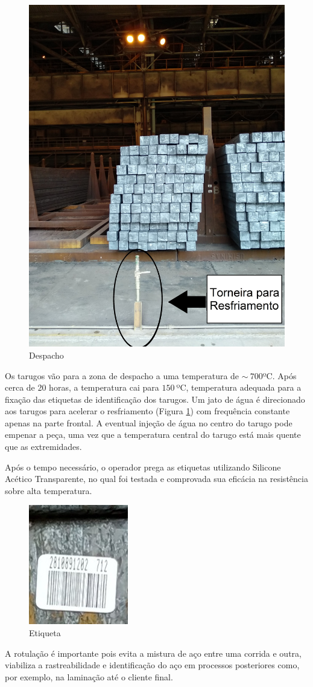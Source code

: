 \begin{figure}[htbp]
	\centering
	\includegraphics[width=0.5\linewidth]{figuras/Steel/despacho.jpg}
	\caption{Despacho}
	\label{fig:despacho}
\end{figure}

Os tarugos vão para a zona de despacho a uma temperatura de $\sim~700$ºC.
%
Após cerca de 20 horas, a temperatura cai para $150~$ºC, temperatura adequada para a fixação das etiquetas de identificação dos tarugos.
%
Um jato de água é direcionado aos tarugos para acelerar o resfriamento (Figura \ref{fig:despacho}) com frequência constante apenas na parte frontal.
%
A eventual injeção de água no centro do tarugo pode empenar a peça, uma vez que a temperatura central do tarugo está mais quente que as extremidades.


Após o tempo necessário, o operador prega as etiquetas utilizando Silicone Acético Transparente, no qual foi testada e comprovada sua eficácia na resistência sobre alta temperatura.

\begin{figure}[htbp]
	\centering
	\includegraphics[width=0.25\linewidth]{figuras/Steel/barcode.jpg}
	\caption{Etiqueta}
	\label{fig:barcode}
\end{figure}

A rotulação é importante pois evita a mistura de aço entre uma corrida e outra, viabiliza a rastreabilidade e identificação do aço em processos posteriores como, por exemplo, na laminação até o cliente final. 

